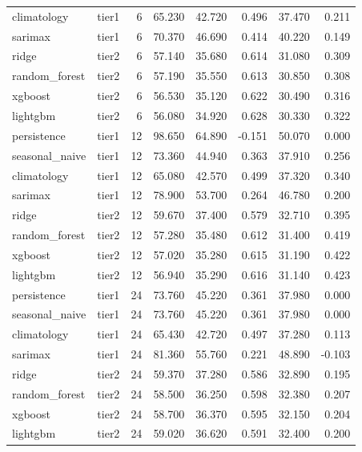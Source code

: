 \begin{table}[htbp]
\begin{tabular}{lrrrrrrr}
climatology & tier1 & 6 & 65.230 & 42.720 & 0.496 & 37.470 & 0.211 \\
sarimax & tier1 & 6 & 70.370 & 46.690 & 0.414 & 40.220 & 0.149 \\
ridge & tier2 & 6 & 57.140 & 35.680 & 0.614 & 31.080 & 0.309 \\
random\_forest & tier2 & 6 & 57.190 & 35.550 & 0.613 & 30.850 & 0.308 \\
xgboost & tier2 & 6 & 56.530 & 35.120 & 0.622 & 30.490 & 0.316 \\
lightgbm & tier2 & 6 & 56.080 & 34.920 & 0.628 & 30.330 & 0.322 \\
persistence & tier1 & 12 & 98.650 & 64.890 & -0.151 & 50.070 & 0.000 \\
seasonal\_naive & tier1 & 12 & 73.360 & 44.940 & 0.363 & 37.910 & 0.256 \\
climatology & tier1 & 12 & 65.080 & 42.570 & 0.499 & 37.320 & 0.340 \\
sarimax & tier1 & 12 & 78.900 & 53.700 & 0.264 & 46.780 & 0.200 \\
ridge & tier2 & 12 & 59.670 & 37.400 & 0.579 & 32.710 & 0.395 \\
random\_forest & tier2 & 12 & 57.280 & 35.480 & 0.612 & 31.400 & 0.419 \\
xgboost & tier2 & 12 & 57.020 & 35.280 & 0.615 & 31.190 & 0.422 \\
lightgbm & tier2 & 12 & 56.940 & 35.290 & 0.616 & 31.140 & 0.423 \\
persistence & tier1 & 24 & 73.760 & 45.220 & 0.361 & 37.980 & 0.000 \\
seasonal\_naive & tier1 & 24 & 73.760 & 45.220 & 0.361 & 37.980 & 0.000 \\
climatology & tier1 & 24 & 65.430 & 42.720 & 0.497 & 37.280 & 0.113 \\
sarimax & tier1 & 24 & 81.360 & 55.760 & 0.221 & 48.890 & -0.103 \\
ridge & tier2 & 24 & 59.370 & 37.280 & 0.586 & 32.890 & 0.195 \\
random\_forest & tier2 & 24 & 58.500 & 36.250 & 0.598 & 32.380 & 0.207 \\
xgboost & tier2 & 24 & 58.700 & 36.370 & 0.595 & 32.150 & 0.204 \\
lightgbm & tier2 & 24 & 59.020 & 36.620 & 0.591 & 32.400 & 0.200 \\
\bottomrule
\end{tabular}
\end{table}
